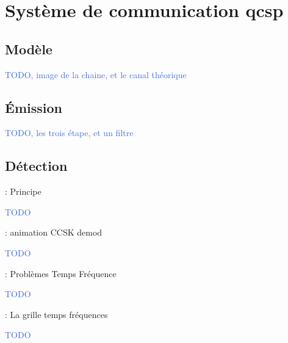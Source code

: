 \documentclass[../main.tex]{subfiles}
\begin{document}
\section{Système de communication \acrshort{qcsp}}

\subsection{Modèle}

\begin{frame}{\subsecname}
  \begin{center}
    \textcolor{RoyalBlue}{TODO, image de la chaine, et le canal théorique}
  \end{center}
\end{frame}

\subsection{Émission}

\begin{frame}{\subsecname}
  \begin{center}
    \textcolor{RoyalBlue}{TODO, les trois étape, et un filtre}
  \end{center}
\end{frame}

\subsection{Détection}

\begin{frame}{\subsecname : {Principe}}
  \begin{center}
    \textcolor{RoyalBlue}{TODO}
  \end{center}
\end{frame}


\begin{frame}{\subsecname : {animation CCSK demod}}
  \begin{center}
    \textcolor{RoyalBlue}{TODO}
  \end{center}
\end{frame}

\begin{frame}{\subsecname : {Problèmes Temps Fréquence}}
  \begin{center}
    \textcolor{RoyalBlue}{TODO}
  \end{center}
\end{frame}


\begin{frame}{\subsecname : {La grille temps fréquences}}
  \begin{center}
    \textcolor{RoyalBlue}{TODO}
  \end{center}
\end{frame}
\end{document}

